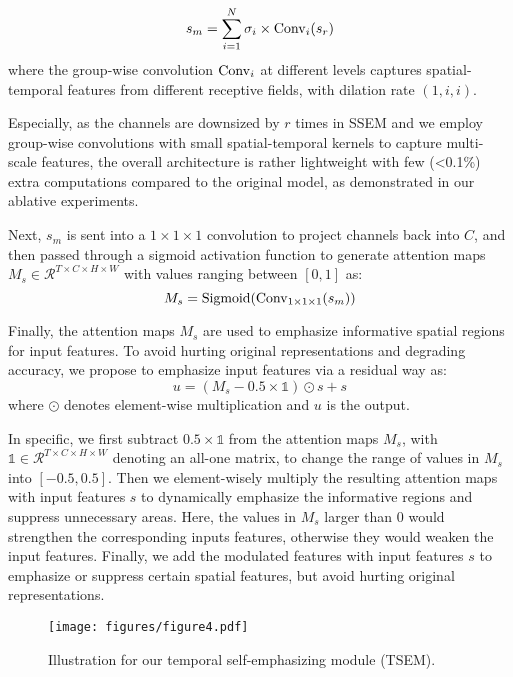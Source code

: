 \documentclass[letterpaper]{article} \usepackage{aaai23}  \usepackage{times}  \usepackage{helvet}  \usepackage{courier}  \usepackage[hyphens]{url}  \usepackage{graphicx} \urlstyle{rm} \def\UrlFont{\rm}  \usepackage{natbib}  \usepackage{caption} \frenchspacing  \setlength{\pdfpagewidth}{8.5in} \setlength{\pdfpageheight}{11in} \usepackage{algorithm}
\begin{document}
\begin{equation}
\label{e1}
s_m = \sum_{i=1}^{N}{\sigma_i \times {\rm Conv}_i(s_r)}
\end{equation}
where the group-wise convolution ${\rm Conv}_i$ at different levels captures spatial-temporal features from different receptive fields, with dilation rate $(1,i,i)$.

Especially, as the channels are downsized by $r$ times in SSEM and we employ group-wise convolutions with small spatial-temporal kernels to capture multi-scale features, the overall architecture is rather lightweight with few (\textless 0.1\%) extra computations compared to the original model, as demonstrated in our ablative experiments.

Next, $s_m$ is sent into a $1\times 1 \times 1$ convolution to project channels back into $C$, and then passed through a sigmoid activation function to generate attention maps $M_s\in \mathcal{R}^{T \times C\times H \times W}$ with values ranging between $[0, 1 ]$ as:
\begin{equation}
\label{e2}
M_s = {\rm Sigmoid}({\rm Conv}_{1\times 1\times 1}(s_m))
\end{equation}

Finally, the attention maps $M_s$ are used to emphasize informative spatial regions for input features. To avoid hurting original representations and degrading accuracy, we propose to emphasize input features via a residual way as:
\begin{equation}
\label{e3}
u = (M_s-0.5\times \mathds{1})\odot s+s
\end{equation}
where $\odot$ denotes element-wise multiplication and $u$ is the output. 

In specific, we first subtract $0.5\times \mathds{1}$ from the attention maps $M_s$, with $\mathds{1}\in \mathcal{R}^{T \times C\times H \times W}$ denoting an all-one matrix, to change the range of values in $M_s$ into $[-0.5, 0.5]$. Then we element-wisely multiply the resulting attention maps with input features $s$ to dynamically emphasize the informative regions and suppress unnecessary areas. Here, the values in $M_s$ larger than 0 would strengthen the corresponding inputs features, otherwise they would weaken the input features. Finally, we add the modulated features with input features $s$ to emphasize or suppress certain spatial features, but avoid hurting original representations.

\begin{figure}[t]
  \centering
  \texttt{[image: figures/figure4.pdf]}
  \caption{Illustration for our temporal self-emphasizing module (TSEM).} \label{fig4}
  \end{figure}
\end{document}
